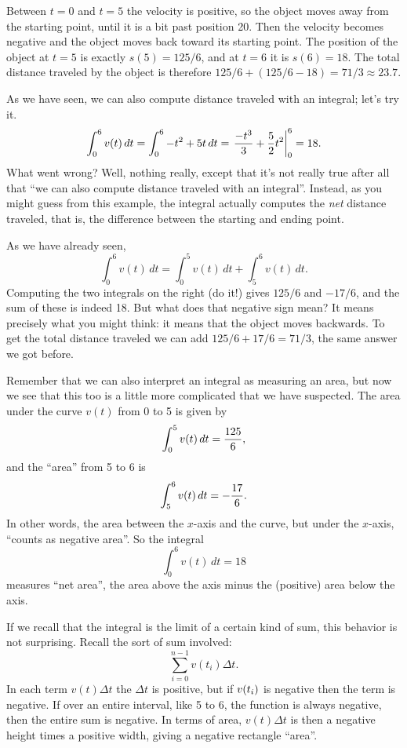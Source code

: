 Between $t=0$ and $t=5$ the velocity is positive, so the object moves
away from the starting point, until it is a bit past position 20. Then
the velocity becomes negative and the object moves back toward its
starting point. The position of the object at $t=5$ is exactly 
$s(5)=125/6$, and at $t=6$ it is $s(6)=18$. The total distance
traveled by the object is therefore $125/6 + (125/6 - 18) =
71/3\approx 23.7$. 

As we have seen, we can also compute distance traveled with an
integral; let's try it.
$$
  \int_0^6 v(t)\,dt = \int_0^6 -t^2+5t\,dt = 
\left.{-t^3\over 3}+{5\over2}t^2\right|_0^6  = 
18.
$$
What went wrong? Well, nothing really, except that it's not really
true after all that ``we can also compute distance traveled with an
integral''. Instead, as you might guess from this example, the
integral actually computes the {\it net\/} distance traveled, that is,
the difference between the starting and ending point.

As we have already seen,
$$
  \int_0^6 v(t)\,dt=\int_0^5 v(t)\,dt+\int_5^6 v(t)\,dt.
$$
Computing the two integrals on the right (do it!) gives
$125/6$ and $-17/6$, and the sum of these is indeed 18. But what does
that negative sign mean? It means precisely what you might think: it
means that the object moves backwards. To get the total distance
traveled we can add $125/6+17/6=71/3$, the same answer we got before.

Remember that we can also interpret an integral as measuring an area,
but now we see that this too is a little more complicated that we have
suspected. The area under the curve $v(t)$ from 0 to 5 is given by 
$$
  \int_0^5 v(t)\,dt={125\over6},
$$
and the ``area'' from 5 to 6 is 
$$
  \int_5^6 v(t)\,dt=-{17\over 6}.
$$
In other words, the area between the $x$-axis and the curve, but under
the $x$-axis, ``counts as negative area''. So the integral
$$
  \int_0^6 v(t)\,dt=18
$$ 
measures ``net area'', the area above the axis minus the (positive)
area below the axis.

If we recall that the integral is the limit of a certain kind of sum,
this behavior is not surprising. Recall the sort of sum involved:
$$
  \sum_{i=0}^{n-1} v(t_i)\Delta t.
$$
In each term $v(t)\Delta t$ the $\Delta t$ is positive, but if
$\displaystyle v(t_i)$ is negative then the term is negative. If over an entire
interval, like 5 to 6, the function is always negative, then the
entire sum is negative. In terms of area, $v(t)\Delta t$ is then a
negative height times a positive width, giving a negative rectangle
``area''. 

